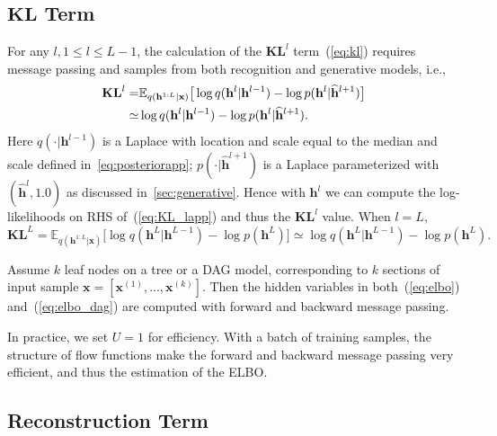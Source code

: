 \documentclass[sigconf, anonymous, review]{acmart}
\theoremstyle{plain}
\theoremstyle{definition}
\theoremstyle{remark}
\begin{document}
\subsection{$\mathbf{KL}$ Term}
For any $l,  1 \leq l \leq L-1$, the calculation of the $\mathbf{KL}^l$ term~(\ref{eq:kl}) requires  message passing and samples  from both recognition and  generative models, i.e.,
\begin{align}\label{eq:KL_lapp}
\mathbf{KL}^l= & \mathbb{E}_{q(\mathbf{h}^{1:L}|\mathbf{x})}\big[  \log q(\mathbf{h}^{l}|\mathbf{h}^{l-1})   - \log p(\mathbf{h}^{l}|\widehat{\mathbf{h}}^{l+1}) \big] \\ \notag
\simeq  & \log q(\mathbf{h}^{l}|\mathbf{h}^{l-1})   - \log p(\mathbf{h}^{l}|\widehat{\mathbf{h}}^{l+1}).
\end{align} 
Here $q(\cdot|\mathbf{h}^{l-1})$ is a Laplace with location and scale equal to the median and scale defined in~\eqref{eq:posteriorapp}; $p(\cdot|\widehat{\mathbf{h}}^{l+1})$ is a  Laplace parameterized  with  $(\widehat{\mathbf{h}}^{l}, 1.0)$ as discussed in~\ref{sec:generative}. Hence with $\mathbf{h}^{l}$ we can compute the log-likelihoods on RHS of~(\ref{eq:KL_lapp}) and thus the $\mathbf{KL}^l$ value. When $l=L$, 
$\mathbf{KL}^L =  \mathbb{E}_{q(\mathbf{h}^{1:L}|\mathbf{x})}\big[  \log q(\mathbf{h}^{L}|\mathbf{h}^{L-1})- \log p(\mathbf{h}^{L})  \big] \simeq \log q(\mathbf{h}^{L}|\mathbf{h}^{L-1})- \log p(\mathbf{h}^{L}) .$


 
Assume  $k$ leaf nodes on a tree or a DAG model, corresponding to $k$ sections of  input sample $\mathbf{x} = [\mathbf{x}^{(1)}, ..., \mathbf{x}^{(k)}]$. Then the hidden variables in both~(\ref{eq:elbo}) and~(\ref{eq:elbo_dag}) are computed with forward and backward message passing. 

In practice, we set $U=1$ for efficiency. With a batch of training samples, the structure of flow functions make the  forward  and  backward message passing very efficient, and  thus the estimation of the ELBO.  


\subsection{Reconstruction Term}
\end{document}
